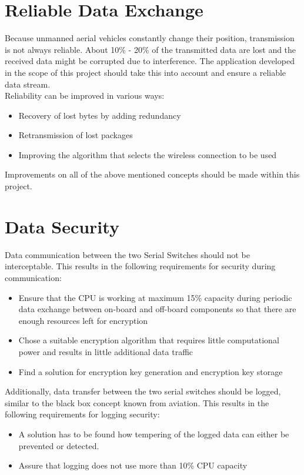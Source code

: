 \section{Reliable Data Exchange}
Because unmanned aerial vehicles constantly change their position, transmission is not always reliable. About 10\% - 20\% of the transmitted data are lost and the received data might be corrupted due to interference. The application developed in the scope of this project should take this into account and ensure a reliable data stream.\\
Reliability can be improved in various ways: \begin{itemize}
    \item Recovery of lost bytes by adding redundancy
    \item Retransmission of lost packages
    \item Improving the algorithm that selects the wireless connection to be used
\end{itemize}
Improvements on all of the above mentioned concepts should be made within this project.
%
%
%
\section{Data Security}
Data communication between the two Serial Switches should not be interceptable. This results in the following requirements for security during communication: \begin{itemize}
    \item Ensure that the CPU is working at maximum 15\% capacity during periodic data exchange between on-board and off-board components so that there are enough resources left for encryption
    \item Chose a suitable encryption algorithm that requires little computational power and results in little additional data traffic
    \item Find a solution for encryption key generation and encryption key storage
\end{itemize}
Additionally, data transfer between the two serial switches should be logged, similar to the black box concept known from aviation. This results in the following requirements for logging security: \begin{itemize}
    \item A solution has to be found how tempering of the logged data can either be prevented or detected.
    \item Assure that logging does not use more than 10\% CPU capacity
\end{itemize}